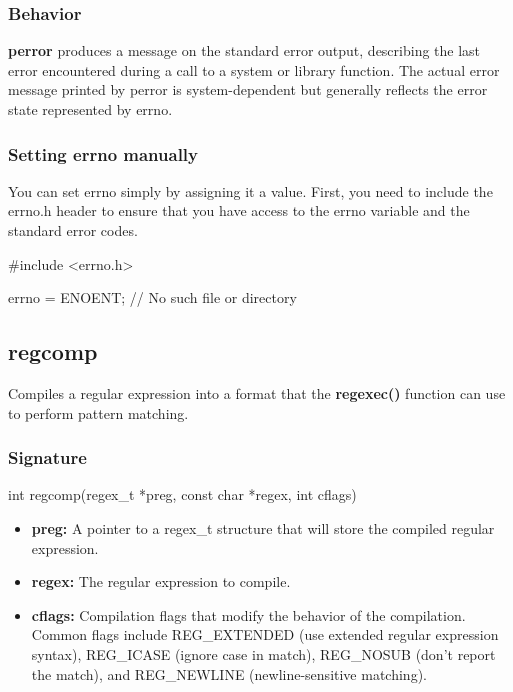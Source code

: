 \documentclass{report}
\begin{document}
    \subsubsection{Behavior}
    \bigbreak \noindent 
    \textbf{perror} produces a message on the standard error output, describing the last error encountered during a call to a system or library function. The actual error message printed by perror is system-dependent but generally reflects the error state represented by errno.
    \bigbreak \noindent 
    \subsubsection{Setting errno manually}
    \bigbreak \noindent 
    You can set errno simply by assigning it a value. First, you need to include the errno.h header to ensure that you have access to the errno variable and the standard error codes.
    \bigbreak \noindent 
    \begin{cppcode}
    #include <errno.h>

    errno = ENOENT; // No such file or directory
    \end{cppcode}


    


    \pagebreak 
    \bigbreak \noindent 
    \subsection{regcomp}
    \bigbreak \noindent 
    \begin{concept}
        Compiles a regular expression into a format that the \textbf{regexec()} function can use to perform pattern matching.
    \end{concept}
    \bigbreak \noindent 
    \subsubsection{Signature}
    \bigbreak \noindent 
    \begin{cppcode}
       int regcomp(regex_t *preg, const char *regex, int cflags) 
    \end{cppcode}
    \begin{itemize}
        \item \textbf{preg:} A pointer to a regex\_t structure that will store the compiled regular expression.
        \item \textbf{regex:} The regular expression to compile.
        \item \textbf{cflags:} Compilation flags that modify the behavior of the compilation. Common flags include REG\_EXTENDED (use extended regular expression syntax), REG\_ICASE (ignore case in match), REG\_NOSUB (don't report the match), and REG\_NEWLINE (newline-sensitive matching).
    \end{itemize}
\end{document}
